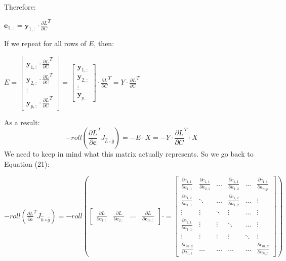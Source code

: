 \documentclass{article}
\begin{document}
Therefore:
\begin{center}
        $\mathbf{e}_{1,:} = \mathbf{y}_{1,:} \cdot \frac{\partial L}{\partial C}^T$
\end{center}
If we repeat for all rows of $E$, then:
\begin{center}
   $E = \begin{bmatrix}
        \mathbf{y}_{1,:} \cdot \frac{\partial L}{\partial C}^T \\
        \mathbf{y}_{2,:} \cdot \frac{\partial L}{\partial C}^T\\
        \vdots \\
        \mathbf{y}_{p,:} \cdot \frac{\partial L}{\partial C}^T
    \end{bmatrix}
    = \begin{bmatrix}
        \mathbf{y}_{1,:}  \\
        \mathbf{y}_{2,:} \\
        \vdots \\
        \mathbf{y}_{p,:} 
    \end{bmatrix} \cdot \frac{\partial L}{\partial C}^T = Y \cdot \frac{\partial L}{\partial C}^T$
\end{center}
As a result:
\begin{equation}
    -roll(\frac{\partial L}{\partial \mathbf{c}}^{T} J_{\widehat{h}\circ\widehat{g}}) = -E \cdot X = -Y \cdot \frac{\partial L}{\partial C}^T \cdot X
\end{equation}
We need to keep in mind what this matrix actually represents. So we go back to Equation (21):
\begin{center}
    $ -roll(\frac{\partial L}{\partial \mathbf{c}}^{T} J_{\widehat{h}\circ\widehat{g}}) = 
    -roll(\begin{bmatrix}
        \frac{\partial L}{\partial \mathbf{c}_{1,:}} & \frac{\partial L}{\partial \mathbf{c}_{2,:}} & \hdots & \frac{\partial L}{\partial \mathbf{c}_{m,:}}
    \end{bmatrix} \cdot= \begin{bmatrix}
    \frac{\partial c_{1,1}}{\partial a_{1,1}} & \frac{\partial c_{1,1}}{\partial a_{2,1}} &\hdots &  \frac{\partial c_{1,1}}{\partial a_{1,2}} &\hdots & \frac{\partial c_{1,1}}{\partial a_{n,p}} \\
    \frac{\partial c_{1,2}}{\partial a_{1,1}}  & \ddots &\hdots & \frac{\partial c_{1,2}}{\partial a_{1,2}}& \hdots& \vdots \\
    \vdots & \vdots & \ddots & \vdots & \hdots & \vdots\\
    \frac{\partial c_{2,1}}{\partial a_{1,1}} & \vdots & \vdots & \ddots & \hdots & \vdots\\
    \vdots & \vdots & \vdots & \vdots & \ddots & \vdots\\
    \frac{\partial c_{m,q}}{\partial a_{1,1}}  & \hdots & \hdots & \hdots & \hdots & \frac{\partial c_{m,q}}{\partial a_{n,p}}
\end{bmatrix})
    $
\end{center}
\end{document}
